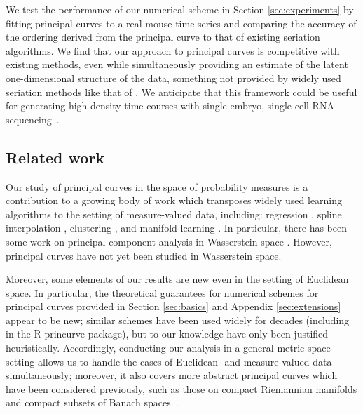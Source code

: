 \documentclass[aos, preprint]{imsart}
\theoremstyle{plain}
\theoremstyle{remark}
\begin{document}
We test the performance of our numerical scheme in Section \ref{sec:experiments} by fitting principal curves to a real mouse time series \cite{mouse_time_series} and comparing the accuracy of the ordering derived from the principal curve to that of existing seriation algorithms. We find that our approach to principal curves is competitive with existing methods, even while simultaneously providing an estimate of the latent one-dimensional structure of the data, something not provided by widely used seriation methods like that of \cite{atkins_spectral_1998}.
We anticipate that this framework could be useful for generating high-density time-courses with single-embryo, single-cell RNA-sequencing~\cite{mouse_time_series, mittnenzweig2021single}.

\subsection{Related work}

Our study of principal curves in the space
of probability measures is a contribution to a growing body of work
which transposes widely used learning algorithms to the setting of
measure-valued data, including: regression \cite{karimi2021regression, chen2023wasserstein, pmlr-v31-poczos13a, ghodrati2022distribution, lavenant2024towards, chizat2022trajectory, schiebinger2019optimal}, spline interpolation \cite{benamou2019second, chen2018measure, chewi2021fast, justiniano2023approximation}, clustering \cite{zhuang2022wasserstein, rao2020wasserstein, verdinelli2019hybrid},  and manifold learning \cite{hamm2023manifold}. In particular, there has been some work on principal component analysis in Wasserstein space \cite{bigot2017geodesic, seguy2015principal, cazelles2018geodesic, karimi2020statistical, wang2013linear}. However, principal curves have not yet been studied in Wasserstein space.

Moreover, some elements of
our results are new even in the setting
of Euclidean space. In particular,  the theoretical guarantees for
numerical schemes for principal curves provided in Section \ref{sec:basics} and Appendix \ref{sec:extensions} appear to be new; similar schemes have been used widely for decades (including in the R princurve package), but to our knowledge have only been
justified heuristically.
Accordingly, conducting our analysis in a general metric space setting allows us to handle the cases of Euclidean- and measure-valued data simultaneously; moreover, it also covers more abstract principal curves which have been considered previously, such as those on compact Riemannian manifolds \cite{hauberg2015principal} and compact subsets of Banach spaces~\cite{smola2001regularized}.
\end{document}
